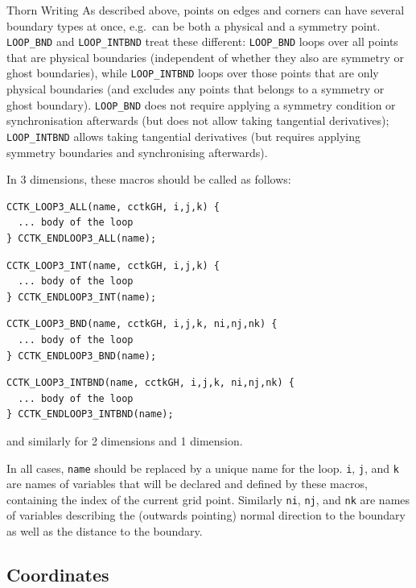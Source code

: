 \begin{cactuspart}{Thorn Writing}
As described above, points on edges and corners can have several
boundary types at once, e.g.\ can be both a physical and a symmetry
point. \texttt{LOOP\_BND} and \texttt{LOOP\_INTBND} treat these
different: \texttt{LOOP\_BND} loops over all points that are physical
boundaries (independent of whether they also are symmetry or ghost
boundaries), while \texttt{LOOP\_INTBND} loops over those points that
are only physical boundaries (and excludes any points that belongs to
a symmetry or ghost boundary). \texttt{LOOP\_BND} does not require
applying a symmetry condition or synchronisation afterwards (but does
not allow taking tangential derivatives); \texttt{LOOP\_INTBND} allows
taking tangential derivatives (but requires applying symmetry
boundaries and synchronising afterwards).

In 3 dimensions, these macros should be called as follows:
\begin{verbatim}
CCTK_LOOP3_ALL(name, cctkGH, i,j,k) {
  ... body of the loop
} CCTK_ENDLOOP3_ALL(name);
\end{verbatim}

\begin{verbatim}
CCTK_LOOP3_INT(name, cctkGH, i,j,k) {
  ... body of the loop
} CCTK_ENDLOOP3_INT(name);
\end{verbatim}

\begin{verbatim}
CCTK_LOOP3_BND(name, cctkGH, i,j,k, ni,nj,nk) {
  ... body of the loop
} CCTK_ENDLOOP3_BND(name);
\end{verbatim}

\begin{verbatim}
CCTK_LOOP3_INTBND(name, cctkGH, i,j,k, ni,nj,nk) {
  ... body of the loop
} CCTK_ENDLOOP3_INTBND(name);
\end{verbatim}
and similarly for 2 dimensions and 1 dimension.

In all cases, \texttt{name} should be replaced by a unique name for
the loop. \texttt{i}, \texttt{j}, and \texttt{k} are names of
variables that will be declared and defined by these macros,
containing the index of the current grid point. Similarly \texttt{ni},
\texttt{nj}, and \texttt{nk} are names of variables describing the
(outwards pointing) normal direction to the boundary as well as the
distance to the boundary.



\subsection{Coordinates}
\label{sec:CactusAPI.coordinates}


\end{cactuspart}
